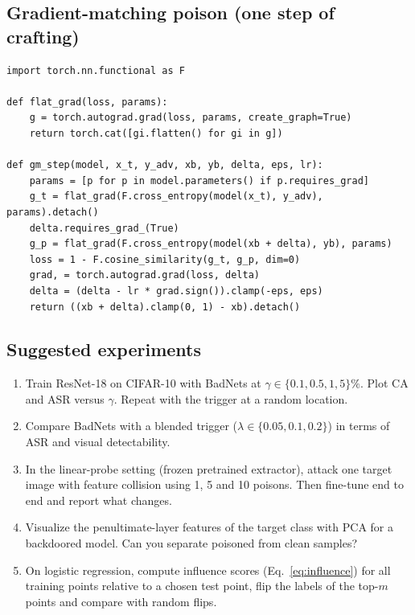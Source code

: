 \documentclass[10pt,a4paper]{extarticle}
\theoremstyle{definition}
\begin{document}
\subsection{Gradient-matching poison (one step of crafting)}

\begin{lstlisting}
import torch.nn.functional as F

def flat_grad(loss, params):
    g = torch.autograd.grad(loss, params, create_graph=True)
    return torch.cat([gi.flatten() for gi in g])

def gm_step(model, x_t, y_adv, xb, yb, delta, eps, lr):
    params = [p for p in model.parameters() if p.requires_grad]
    g_t = flat_grad(F.cross_entropy(model(x_t), y_adv), params).detach()
    delta.requires_grad_(True)
    g_p = flat_grad(F.cross_entropy(model(xb + delta), yb), params)
    loss = 1 - F.cosine_similarity(g_t, g_p, dim=0)
    grad, = torch.autograd.grad(loss, delta)
    delta = (delta - lr * grad.sign()).clamp(-eps, eps)
    return ((xb + delta).clamp(0, 1) - xb).detach()
\end{lstlisting}

\subsection{Suggested experiments}

\begin{enumerate}[label=\textbf{\arabic*.}]
  \item Train ResNet-18 on CIFAR-10 with BadNets at \(\gamma\in\{0.1,0.5,1,5\}\%\). Plot CA and ASR versus \(\gamma\). Repeat with the trigger at a random location.
  \item Compare BadNets with a blended trigger (\(\lambda\in\{0.05,0.1,0.2\}\)) in terms of ASR and visual detectability.
  \item In the linear-probe setting (frozen pretrained extractor), attack one target image with feature collision using 1, 5 and 10 poisons. Then fine-tune end to end and report what changes.
  \item Visualize the penultimate-layer features of the target class with PCA for a backdoored model. Can you separate poisoned from clean samples?
  \item On logistic regression, compute influence scores (Eq.~\ref{eq:influence}) for all training points relative to a chosen test point, flip the labels of the top-\(m\) points and compare with random flips.
\end{enumerate}
\end{document}
